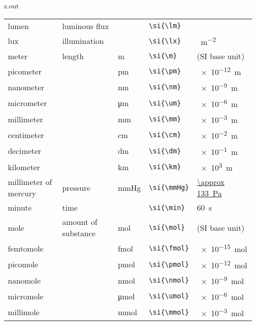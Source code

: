 \begin{VerbatimOut}{z.out}
{\begin{longtable}{@{}P{1.4in}P{1in}llP{1.8in}@{}}
    \vsp
    lumen&
      luminous flux&
      \si{\lm}&
      \verb+\si{\lm}+&
      \si{\cd\sr}\\
    \vsp
    lux&
      illumination&
      \si{\lx}&
      \verb+\si{\lx}+&
      \si{\lm\per\m\squared}\\
    \vsp
    meter&
      length&
      \si{\m}&
      \verb+\si{\m}+&
      (SI base unit)\\
    \quad picometer&
      \ditto&
      \si{\pm}&
      \verb+\si{\pm}+&
      \SI{e-12}{\m}\\
    \quad nanometer&
      \ditto&
      \si{\nm}&
      \verb+\si{\nm}+&
      \SI{e-9}{\m}\\
    \quad micrometer&
      \ditto&
      \si{\um}&
      \verb+\si{\um}+&
      \SI{e-6}{\m}\\
    \quad millimeter&
      \ditto&
      \si{\mm}&
      \verb+\si{\mm}+&
      \SI{e-3}{\m}\\
    \quad centimeter&
      \ditto&
      \si{\cm}&
      \verb+\si{\cm}+&
      \SI{e-2}{\m}\\
    \quad decimeter&
      \ditto&
      \si{\dm}&
      \verb+\si{\dm}+&
      \SI{e-1}{\m}\\
    \quad kilometer&
      \ditto&
      \si{\km}&
      \verb+\si{\km}+&
      \SI{e3}{\m}\\
    \vsp
    millimeter of mercury&
      pressure&
      \si{\mmHg}&
      \verb+\si{\mmHg}+&
      \href{https://en.wikipedia.org/wiki/Millimetre_of_mercury}{\SI{\approx 133}{\Pa}}\\
    \vsp
    minute&
      time&
      \si{\min}&
      \verb+\si{\min}+&
      \SI{60}{\s}\\
    \vsp
    mole&
      amount of substance&
      \si{\mol}&
      \verb+\si{\mol}+&
      (SI base unit)\\
    \quad femtomole&
      \ditto&
      \si{\fmol}&
      \verb+\si{\fmol}+&
      \SI{e-15}{\mol}\\
    \quad picomole&
      \ditto&
      \si{\pmol}&
      \verb+\si{\pmol}+&
      \SI{e-12}{\mol}\\
    \quad nanomole&
      \ditto&
      \si{\nmol}&
      \verb+\si{\nmol}+&
      \SI{e-9}{\mol}\\
    \quad micromole&
      \ditto&
      \si{\umol}&
      \verb+\si{\umol}+&
      \SI{e-6}{\mol}\\
    \quad millimole&
      \ditto&
      \si{\mmol}&
      \verb+\si{\mmol}+&
      \SI{e-3}{\mol}\\

\end{longtable}}
\end{VerbatimOut}
